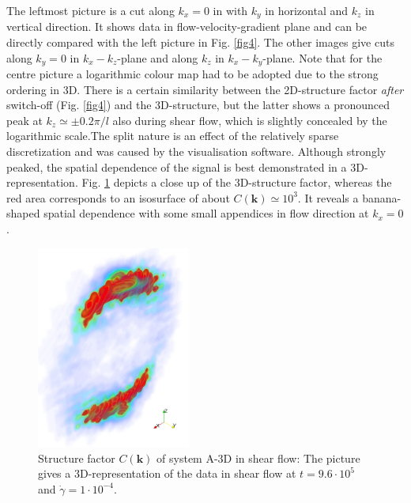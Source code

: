 \documentclass[8.5pt,twoside,twocolumn]{article}
\newcommand{\e}[1]{\cdot10^{#1}}
\begin{document}
The leftmost picture is a cut along $k_x=0$ in with $k_y$ in horizontal and $k_z$ in vertical direction.
It shows data in flow-velocity-gradient plane and can be directly compared with the left picture in Fig. \ref{fig4}.
The other images give cuts along $k_y=0$ in $k_x-k_z$-plane and along $k_z$ in $k_x-k_y$-plane. 
Note that for the centre picture a logarithmic colour map had to be adopted due to the strong ordering in 3D.
There is a certain similarity between the 2D-structure factor {\it after} switch-off (Fig. \ref{fig4}) and the 3D-structure, but the latter shows a pronounced peak at $k_z\simeq\pm0.2\pi/l$ also during shear flow, which is slightly concealed by the logarithmic scale.The split nature is an effect of the relatively sparse discretization and was caused by the visualisation software.
Although strongly peaked, the spatial dependence of the signal is best demonstrated in a 3D-representation. 
Fig. \ref{fig15} depicts a close up of the 3D-structure factor, whereas the red area corresponds to an isosurface of about $C({\bm k})\simeq 10^3$.
It reveals a banana-shaped spatial dependence with some small appendices in flow direction at $k_x=0$.

\begin{figure}[htp!]
\centering
\includegraphics[angle=0,width=0.45\textwidth]{ck_run788_960_zoom.jpg}
\caption{Structure factor $C({\mathbf k})$ of system A-3D in shear flow: The picture gives a 3D-representation of the data in shear flow at $t=9.6\e{5}$ and $\dot{\gamma}=1\cdot10^{-4}$.}
\label{fig15}
\end{figure}
\end{document}
